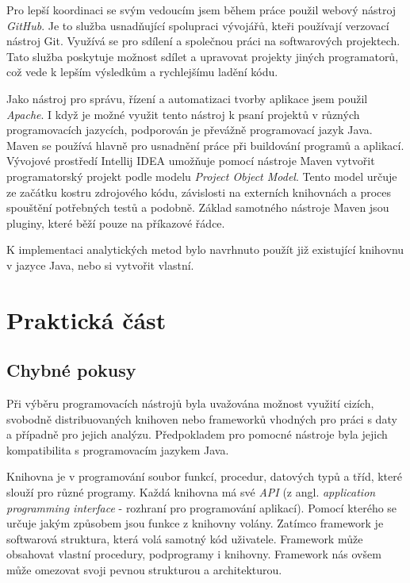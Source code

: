 \documentclass[a4paper,12pt,twoside]{scrreprt}
\begin{document}
Pro lepší koordinaci se svým vedoucím jsem během práce použil webový nástroj \textit{GitHub}. Je to služba usnadňující spolupraci vývojářů, kteři používají verzovací nástroj Git. Využívá se pro sdílení a společnou práci na softwarových projektech. Tato služba poskytuje možnost sdílet a upravovat projekty jiných programatorů, což vede k lepším výsledkům a rychlejšímu ladění kódu. 

Jako nástroj pro správu, řízení a automatizaci tvorby aplikace jsem použil \textit{Apache}. I když je možné využit tento nástroj k psaní projektů v různých programovacích jazycích, podporován je převážně programovací jazyk Java. Maven se používá hlavně pro usnadnění práce při buildování programů a aplikací. Vývojové prostředí Intellij IDEA umožňuje pomocí nástroje Maven vytvořit programatorský projekt podle modelu \textit{Project Object Model}. Tento model určuje ze začátku kostru zdrojového kódu, závislosti na externích knihovnách a proces spouštění potřebných testů a podobně. Základ samotného nástroje Maven jsou pluginy, které běží pouze na příkazové řádce. 

K implementaci analytických metod bylo navrhnuto použít již existující knihovnu v jazyce Java, nebo si vytvořit vlastní. 

\chapter{Praktická část}
\section{Chybné pokusy}
\vspace{0.5cm}

Při výběru programovacích nástrojů byla uvažována možnost využití cizích, svobodně distribuovaných knihoven nebo frameworků vhodných pro práci s daty a případně pro jejich analýzu. Předpokladem pro pomocné nástroje byla jejich kompatibilita s programovacím jazykem Java. 

Knihovna je v programování soubor funkcí, procedur, datových typů a tříd, které slouží pro různé programy. Každá knihovna má své \textit{API} (z angl. \textit{application programming interface} - rozhraní pro programování aplikací). Pomocí kterého se určuje jakým způsobem jsou funkce z knihovny volány. Zatímco framework je softwarová struktura, která volá samotný kód uživatele. Framework může obsahovat vlastní procedury, podprogramy i knihovny. Framework nás ovšem může omezovat svoji pevnou strukturou a architekturou. 
\end{document}
